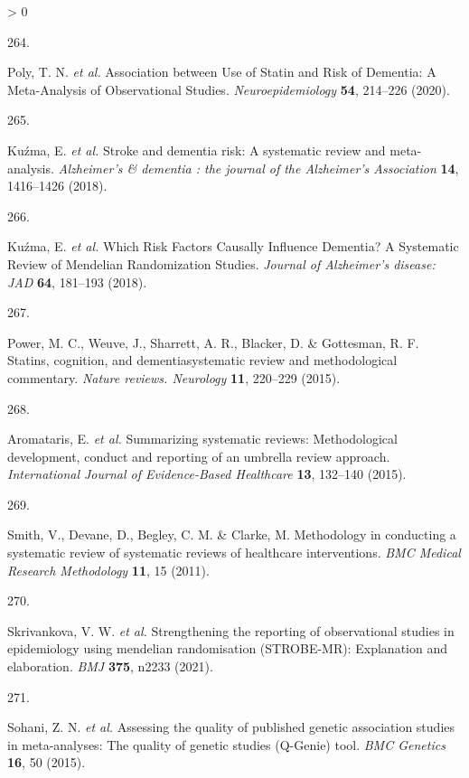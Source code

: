 \documentclass[a4paper, twoside]{templates/ociamthesis}
\newlength{\cslhangindent}
\newlength{\csllabelwidth}
\newenvironment{CSLReferences}[3] %
 {%
  \setlength{\parindent}{0pt}
  \ifodd #1 \everypar{\setlength{\hangindent}{\cslhangindent}}\ignorespaces\fi
  \ifnum #2 > 0
  \setlength{\parskip}{#2\baselineskip}
  \fi
 }%
 {}
\newcommand{\CSLLeftMargin}[1]{\parbox[t]{\maxof{\widthof{#1}}{\csllabelwidth}}{#1}}
\newcommand{\CSLRightInline}[1]{\parbox[t]{\linewidth - \csllabelwidth}{#1}}
\begin{document}
\begin{CSLReferences}{0}{0}
\leavevmode\hypertarget{ref-poly2020}{}%
\CSLLeftMargin{264. }
\CSLRightInline{Poly, T. N. \emph{et al.} Association between {Use} of {Statin} and {Risk} of {Dementia}: A {Meta}-{Analysis} of {Observational Studies}. \emph{Neuroepidemiology} \textbf{54}, 214--226 (2020).}

\leavevmode\hypertarget{ref-kuzma2018stroke}{}%
\CSLLeftMargin{265. }
\CSLRightInline{Kuźma, E. \emph{et al.} Stroke and dementia risk: A systematic review and meta-analysis. \emph{Alzheimer's \& dementia : the journal of the Alzheimer's Association} \textbf{14}, 1416--1426 (2018).}

\leavevmode\hypertarget{ref-kuzma2018risk}{}%
\CSLLeftMargin{266. }
\CSLRightInline{Kuźma, E. \emph{et al.} Which {Risk Factors Causally Influence Dementia}? A {Systematic Review} of {Mendelian Randomization Studies}. \emph{Journal of Alzheimer's disease: JAD} \textbf{64}, 181--193 (2018).}

\leavevmode\hypertarget{ref-power2015}{}%
\CSLLeftMargin{267. }
\CSLRightInline{Power, M. C., Weuve, J., Sharrett, A. R., Blacker, D. \& Gottesman, R. F. Statins, cognition, and dementia{}systematic review and methodological commentary. \emph{Nature reviews. Neurology} \textbf{11}, 220--229 (2015).}

\leavevmode\hypertarget{ref-aromataris2015}{}%
\CSLLeftMargin{268. }
\CSLRightInline{Aromataris, E. \emph{et al.} Summarizing systematic reviews: Methodological development, conduct and reporting of an umbrella review approach. \emph{International Journal of Evidence-Based Healthcare} \textbf{13}, 132--140 (2015).}

\leavevmode\hypertarget{ref-smith2011}{}%
\CSLLeftMargin{269. }
\CSLRightInline{Smith, V., Devane, D., Begley, C. M. \& Clarke, M. Methodology in conducting a systematic review of systematic reviews of healthcare interventions. \emph{BMC Medical Research Methodology} \textbf{11}, 15 (2011).}

\leavevmode\hypertarget{ref-skrivankova2021}{}%
\CSLLeftMargin{270. }
\CSLRightInline{Skrivankova, V. W. \emph{et al.} Strengthening the reporting of observational studies in epidemiology using mendelian randomisation ({STROBE}-{MR}): Explanation and elaboration. \emph{BMJ} \textbf{375}, n2233 (2021).}

\leavevmode\hypertarget{ref-sohani2015}{}%
\CSLLeftMargin{271. }
\CSLRightInline{Sohani, Z. N. \emph{et al.} Assessing the quality of published genetic association studies in meta-analyses: The quality of genetic studies ({Q}-{Genie}) tool. \emph{BMC Genetics} \textbf{16}, 50 (2015).}


\end{CSLReferences}
\end{document}
